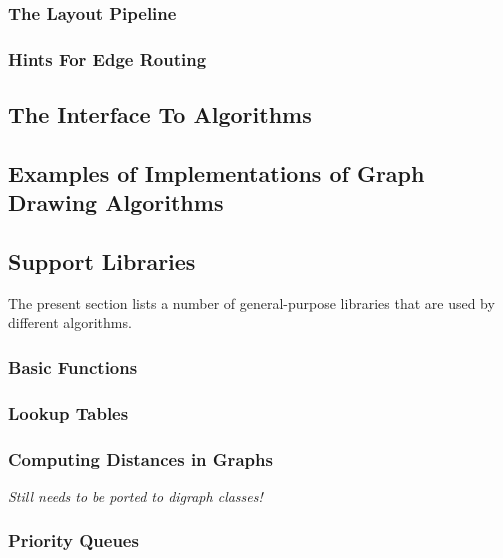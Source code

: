 \subsubsection{The Layout Pipeline}



\subsubsection{Hints For Edge Routing}



\subsection{The Interface To Algorithms}
\label{section-gd-interface-to-algorithms}



\subsection{Examples of Implementations of Graph Drawing Algorithms}
\label{section-gd-examples}



\subsection{Support Libraries}
\label{section-gd-libs}

The present section lists a number of general-purpose libraries that are used
by different algorithms.

\subsubsection{Basic Functions}




\subsubsection{Lookup Tables}



\subsubsection{Computing Distances in Graphs}

\emph{Still needs to be ported to digraph classes!}



\subsubsection{Priority Queues}

